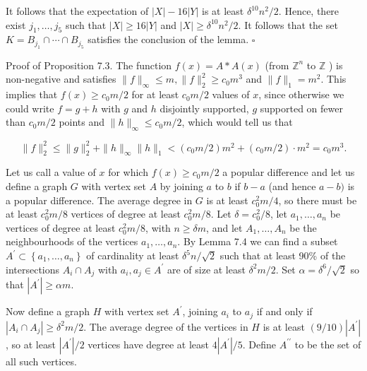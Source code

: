 \documentclass[10pt]{article}
\begin{document}
It follows that the expectation of $|X|-16|Y|$ is at least $\delta^{10} n^{2} / 2$. Hence, there exist $j_{1}, \ldots, j_{5}$ such that $|X| \geqslant 16|Y|$ and $|X| \geqslant \delta^{10} n^{2} / 2$. It follows that the set $K=B_{j_{1}} \cap \cdots \cap B_{j_{5}}$ satisfies the conclusion of the lemma. \(\square\)

Proof of Proposition 7.3. The function $f(x)=A * A(x)$ (from $\mathbb{Z}^{n}$ to $\mathbb{Z}$ ) is non-negative and satisfies $\|f\|_{\infty} \leqslant m,\|f\|_{2}^{2} \geqslant c_{0} m^{3}$ and $\|f\|_{1}=m^{2}$. This implies that $f(x) \geqslant c_{0} m / 2$ for at least $c_{0} m / 2$ values of $x$, since otherwise we could write $f=g+h$ with $g$ and $h$ disjointly supported, $g$ supported on fewer than $c_{0} m / 2$ points and $\|h\|_{\infty} \leqslant c_{0} m / 2$, which would tell us that

$$
\|f\|_{2}^{2} \leqslant\|g\|_{2}^{2}+\|h\|_{\infty}\|h\|_{1}<\left(c_{0} m / 2\right) m^{2}+\left(c_{0} m / 2\right) \cdot m^{2}=c_{0} m^{3} .
$$

Let us call a value of $x$ for which $f(x) \geqslant c_{0} m / 2$ a popular difference and let us define a graph $G$ with vertex set $A$ by joining $a$ to $b$ if $b-a$ (and hence $a-b)$ is a popular difference. The average degree in $G$ is at least $c_{0}^{2} m / 4$, so there must be at least $c_{0}^{2} m / 8$ vertices of degree at least $c_{0}^{2} m / 8$. Let $\delta=c_{0}^{2} / 8$, let $a_{1}, \ldots, a_{n}$ be vertices of degree at least $c_{0}^{2} m / 8$, with $n \geqslant \delta m$, and let $A_{1}, \ldots, A_{n}$ be the neighbourhoods of the vertices $a_{1}, \ldots, a_{n}$. By Lemma 7.4 we can find a subset $A^{\prime} \subset\left\{a_{1}, \ldots, a_{n}\right\}$ of cardinality at least $\delta^{5} n / \sqrt{2}$ such that at least 90\% of the intersections $A_{i} \cap A_{j}$ with $a_{i}, a_{j} \in A^{\prime}$ are of size at least $\delta^{2} m / 2$. Set $\alpha=\delta^{6} / \sqrt{2}$ so that $\left|A^{\prime}\right| \geqslant \alpha m$.

Now define a graph $H$ with vertex set $A^{\prime}$, joining $a_{i}$ to $a_{j}$ if and only if $\left|A_{i} \cap A_{j}\right| \geqslant \delta^{2} m / 2$. The average degree of the vertices in $H$ is at least $(9 / 10)\left|A^{\prime}\right|$, so at least $\left|A^{\prime}\right| / 2$ vertices have degree at least $4\left|A^{\prime}\right| / 5$. Define $A^{\prime \prime}$ to be the set of all such vertices.
\end{document}
